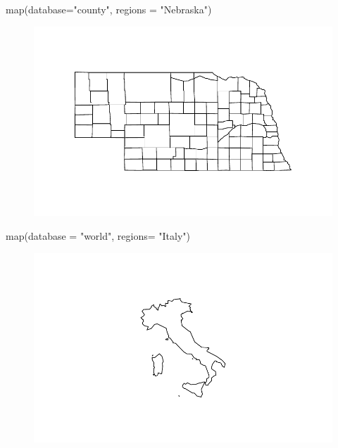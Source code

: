 \documentclass[
  letterpaper,
  DIV=11,
  numbers=noendperiod]{scrreprt}
\newenvironment{Shaded}{\begin{snugshade}}{\end{snugshade}}
\newcommand{\AttributeTok}[1]{\textcolor[rgb]{0.40,0.45,0.13}{#1}}
\newcommand{\FunctionTok}[1]{\textcolor[rgb]{0.28,0.35,0.67}{#1}}
\newcommand{\NormalTok}[1]{\textcolor[rgb]{0.00,0.23,0.31}{#1}}
\newcommand{\StringTok}[1]{\textcolor[rgb]{0.13,0.47,0.30}{#1}}
\begin{document}
\begin{Shaded}
\begin{Highlighting}[]
\FunctionTok{map}\NormalTok{(}\AttributeTok{database=}\StringTok{"county"}\NormalTok{, }\AttributeTok{regions =} \StringTok{"Nebraska"}\NormalTok{)}
\end{Highlighting}
\end{Shaded}

\begin{figure}[H]

{\centering \includegraphics{12-Maps_files/figure-pdf/unnamed-chunk-8-1.pdf}

}

\end{figure}

\begin{Shaded}
\begin{Highlighting}[]
\FunctionTok{map}\NormalTok{(}\AttributeTok{database =} \StringTok{"world"}\NormalTok{, }\AttributeTok{regions=} \StringTok{"Italy"}\NormalTok{)}
\end{Highlighting}
\end{Shaded}

\begin{figure}[H]

{\centering \includegraphics{12-Maps_files/figure-pdf/unnamed-chunk-9-1.pdf}

}

\end{figure}
\end{document}
